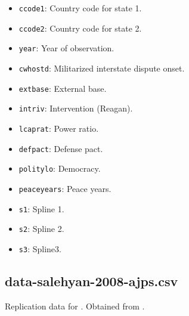 \documentclass[12pt]{article}
\begin{document}
\begin{itemize}
  \item \texttt{ccode1}: Country code for state 1.
  \item \texttt{ccode2}: Country code for state 2.
  \item \texttt{year}: Year of observation.
  \item \texttt{cwhostd}: Militarized interstate dispute onset.
  \item \texttt{extbase}: External base.
  \item \texttt{intriv}: Intervention (Reagan).
  \item \texttt{lcaprat}: Power ratio.
  \item \texttt{defpact}: Defense pact.
  \item \texttt{politylo}: Democracy.
  \item \texttt{peaceyears}: Peace years.
   \item \texttt{s1}: Spline 1.
  \item \texttt{s2}: Spline 2.
  \item \texttt{s3}: Spline3.
\end{itemize}


\subsection{data-salehyan-2008-ajps.csv}

Replication data for \citet{Salehyan:2008es}.
Obtained from \citet{salehyan2008ajpsdata}.
\end{document}

